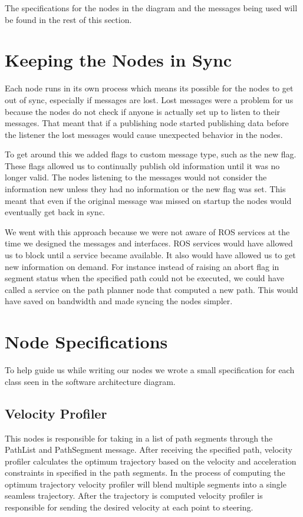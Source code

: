 The specifications for the nodes in the diagram and the messages being
used will be found in the rest of this section.



\section{Keeping the Nodes in Sync}

Each node runs in its own process which means its possible for the nodes to get out of sync, especially if messages are lost. Lost messages were a problem for us because the nodes do not check if anyone is actually set up to listen to their messages. That meant that if a publishing node started publishing data before the listener the lost messages would cause unexpected behavior in the nodes.

To get around this we added flags to custom message type, such as the new flag. These flags allowed us to continually publish old information until it was no longer valid. The nodes listening to the messages would not consider the information new unless they had no information or the new flag was set. This meant that even if the original message was missed on startup the nodes would eventually get back in sync.

We went with this approach because we were not aware of ROS services at the time we designed the messages and interfaces. ROS services would have allowed us to block until a service became available. It also would have allowed us to get new information on demand. For instance instead of raising an abort flag in segment status when the specified path could not be executed, we could have called a service on the path planner node that computed a new path. This would have saved on bandwidth and made syncing the nodes simpler.

\section{Node Specifications}

To help guide us while writing our nodes we wrote a small
specification for each class seen in the software architecture diagram.

\subsection{Velocity Profiler}
This nodes is responsible for taking in a list of path segments through the PathList and PathSegment message. After receiving the specified path, velocity profiler calculates the optimum trajectory based on the velocity and acceleration constraints in specified in the path segments. In the process of computing the optimum trajectory velocity profiler will blend multiple segments into a single seamless trajectory. After the trajectory is computed velocity profiler is responsible for sending the desired velocity at each point to steering.

